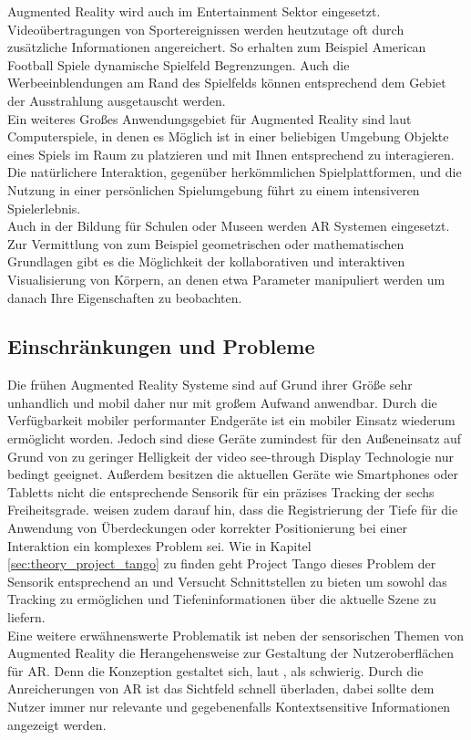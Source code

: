 Augmented Reality wird auch im Entertainment Sektor eingesetzt. Videoübertragungen von Sportereignissen werden heutzutage oft durch zusätzliche Informationen angereichert. So erhalten zum Beispiel American Football Spiele dynamische Spielfeld Begrenzungen. Auch die Werbeeinblendungen am Rand des Spielfelds können entsprechend dem Gebiet der Ausstrahlung ausgetauscht werden. \citep{azuma2001recent} \\

Ein weiteres Großes Anwendungsgebiet für Augmented Reality sind laut \citet{azuma2001recent} Computerspiele, in denen es Möglich ist in einer beliebigen Umgebung Objekte eines Spiels im Raum zu platzieren und mit Ihnen entsprechend zu interagieren. Die natürlichere Interaktion, gegenüber herkömmlichen Spielplattformen, und die Nutzung in einer persönlichen Spielumgebung führt zu einem intensiveren Spielerlebnis. \\

Auch in der Bildung für Schulen oder Museen werden AR Systemen eingesetzt. Zur Vermittlung von zum Beispiel geometrischen oder mathematischen Grundlagen gibt es die Möglichkeit der kollaborativen und interaktiven Visualisierung von Körpern, an denen etwa Parameter manipuliert werden um danach Ihre Eigenschaften zu beobachten. \citep{van2010survey} \\

\subsection{Einschränkungen und Probleme}

Die frühen Augmented Reality Systeme sind auf Grund ihrer Größe sehr unhandlich und mobil daher nur mit großem Aufwand anwendbar. Durch die Verfügbarkeit mobiler performanter Endgeräte ist ein mobiler Einsatz wiederum ermöglicht worden. Jedoch sind diese Geräte zumindest für den Außeneinsatz auf Grund von zu geringer Helligkeit der video see-through Display Technologie nur bedingt geeignet. Außerdem besitzen die aktuellen Geräte wie Smartphones oder Tabletts nicht die entsprechende Sensorik für ein präzises Tracking der sechs Freiheitsgrade. \citet{van2010survey} weisen zudem darauf hin, dass die Registrierung der Tiefe für die Anwendung von Überdeckungen oder korrekter Positionierung bei einer Interaktion ein komplexes Problem sei. Wie in Kapitel \ref{sec:theory_project_tango} zu finden geht Project Tango dieses Problem der Sensorik entsprechend an und Versucht Schnittstellen zu bieten um sowohl das Tracking zu ermöglichen und Tiefeninformationen über die aktuelle Szene zu liefern. \\

Eine weitere erwähnenswerte Problematik ist neben der sensorischen Themen von Augmented Reality die Herangehensweise zur Gestaltung der Nutzeroberflächen für AR. Denn die Konzeption gestaltet sich, laut \citet{azuma2001recent}, als schwierig. Durch die Anreicherungen von AR ist das Sichtfeld schnell überladen, dabei sollte dem Nutzer immer nur relevante und gegebenenfalls Kontextsensitive Informationen angezeigt werden. \\

